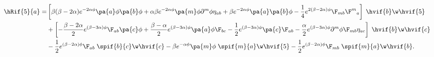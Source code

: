 \begin{align}
  \hRif{5}{a} =& \left[\beta(\beta-2\alpha)e^{-2\alpha\phi}\pa{a}\phi\pa{b}\phi + \alpha\beta e^{-2\alpha\phi}\pa{m}\phi\partial^{m}\phi \eta_{a b} + \beta e^{-2\alpha\phi}\pa{a}\pa{b}\phi -\frac{1}{4}e^{2(\beta-2\alpha)\phi}\F_{m b}\F^m{}_a\right]\;\hvif{b}\w\hvif{5}\nonumber\\
 & + \left[-\frac{\beta-2\alpha}{2}e^{(\beta-3\alpha)\phi}\F_{ab}\pa{c}\phi +\frac{\beta-\alpha}{2}e^{(\beta-3\alpha)\phi}\pa{a}\phi \F_{bc} - \frac{1}{2}e^{(\beta-3\alpha)\phi}\pa{c} \F_{ab} - \frac{\alpha}{2}e^{(\beta-3\alpha)\phi}\partial^{m}\phi\F_{m b} \eta_{a c}
\right]\;\hvif{b}\w\hvif{c}\nonumber\\
  &  %
- \frac{1}{2}e^{(\beta-2\alpha)\phi}\F_{ab}\; \spif{b}{c}\w\hvif{c} - \beta e^{-\alpha\phi}\pa{m}\phi\;\spif{m}{a}\w\hvif{5} - \frac{1}{2}e^{(\beta-2\alpha)\phi}\F_{m b}\;\spif{m}{a}\w\hvif{b}.
\end{align}

